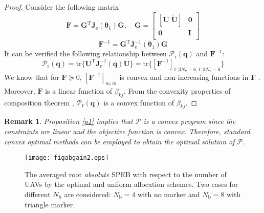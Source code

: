 \documentclass{IEEEtran}
\newtheorem{remark}{Remark}
\begin{document}
\begin{proof}
Consider the following matrix
\begin{equation*}
\mathbf{F}=\mathbf{G}^{\text{T}}\mathbf{J}_{\text{e}}(\boldsymbol{\theta}_1)\mathbf{G}, \quad
\mathbf{G}=
\begin{bmatrix}
  [\mathbf{U} \; \widetilde{\mathbf{U}}]&\mathbf{0}\\
  \mathbf{0}&\mathbf{I}\\
\end{bmatrix}
\end{equation*}
\begin{equation*}
\mathbf{F}^{-1}=\mathbf{G}^{\text{T}}\mathbf{J}_{\text{e}}^{-1}(\boldsymbol{\theta}_1)\mathbf{G}
\end{equation*}
It can be verified the following relationship between $\mathcal{P}_{\text{r}}(\mathbf{q})$ and $\mathbf{F}^{-1}$:
\begin{equation*}
\mathcal{P}_{\text{r}}(\mathbf{q})=\text{tr}\{\mathbf{U}^{\text{T}}\mathbf{J}_{\text{e}}^{-1}(\mathbf{q})\mathbf{U}\}=\text{tr}\{[\mathbf{F}^{-1}]_{1:3N_{\text{v}}-6,1:3N_{\text{v}}-6}\}
\end{equation*}
We know that for $\mathbf{F}\succeq 0$, $[\mathbf{F}^{-1}]_{m,m}$ is convex and non-increasing functions in $\mathbf{F}$ \cite{BoyVan:B04}. Moreover, $\mathbf{F}$ is a linear function of $\beta_{kj}$. From the convexity properties of composition theorem \cite{BoyVan:B04}, $\mathcal{P}_{\text{r}}(\mathbf{q})$ is a convex function of $\beta_{kj}$.
\end{proof}

\begin{remark}
Proposition \ref{p1} implies that $\mathscr{P}$ is a convex program since the constraints are linear and the objective function is convex. Therefore, standard convex optimal methods can be employed to obtain the optimal solution of $\mathscr{P}$.
\end{remark}
\begin{figure}[t]
    \centering
    \texttt{[image: figabgain2.eps]}
    \caption{The averaged root \emph{absolute} SPEB with respect to the number of UAVs by the optimal and uniform allocation schemes. Two cases for different $N_{\text{b}}$ are considered: $N_{\text{b}}=4$ with no marker and $N_{\text{b}}=8$ with triangle marker.}\label{Fig2}
\end{figure}
\end{document}
